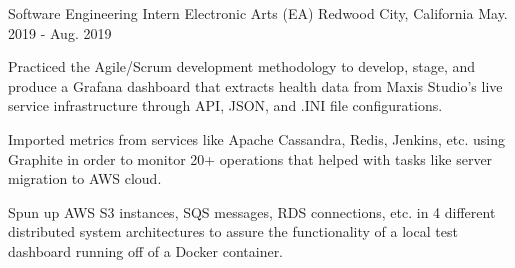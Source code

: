\begin{cventries}
  \cventry
    {Software Engineering Intern} %
    {Electronic Arts (EA)} %
    {Redwood City, California} %
    {May. 2019 - Aug. 2019} %
    {
      \begin{cvitems} %
        \item {Practiced the Agile/Scrum development methodology to develop, stage, and produce a Grafana dashboard that extracts health data from Maxis Studio's live service infrastructure through API, JSON, and .INI file configurations.}
        \item {Imported metrics from services like Apache Cassandra, Redis, Jenkins, etc. using Graphite in order to monitor 20+ operations that helped with tasks like server migration to AWS cloud.}
        \item {Spun up AWS S3 instances, SQS messages, RDS connections, etc. in 4 different distributed system architectures to assure the functionality of a local test dashboard running off of a Docker container.}
      \end{cvitems}
    }

\end{cventries}
